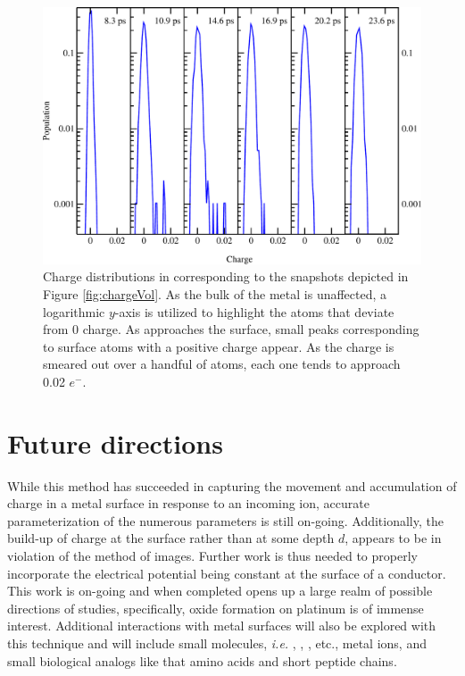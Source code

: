 \begin{figure}
  \centering
  \includegraphics[width=0.9\linewidth]{../figures/chap5/frameChargeDistribution.pdf}
  \caption{Charge distributions in  corresponding to the snapshots
depicted in Figure \ref{fig:chargeVol}. As the bulk of the metal is unaffected, a
logarithmic $y$-axis is utilized to highlight the atoms that deviate from 0
charge. As  approaches the surface, small peaks corresponding to surface
 atoms with a positive charge appear. As the charge is smeared
out over a handful of  atoms, each one tends to approach 0.02 $e^-$.}
\label{fig:chargeHistogram}
\end{figure}

\section{Future directions}
While this method has succeeded in capturing the movement and accumulation of
charge in a metal surface in response to an incoming ion, accurate
parameterization of the numerous parameters is still on-going. Additionally,
the build-up of charge at the surface rather than at some depth $d$, appears to
be in violation of the method of images. Further work is thus needed to
properly incorporate the electrical potential being constant at the surface of
a conductor.  This work is on-going and when completed opens up a large realm
of possible directions of studies, specifically, oxide formation on platinum is
of immense interest. Additional interactions with metal surfaces will also be
explored with this technique and will include small molecules, {\em i.e.}
, , , etc., metal ions, and small biological analogs like
that amino acids and short peptide chains.



